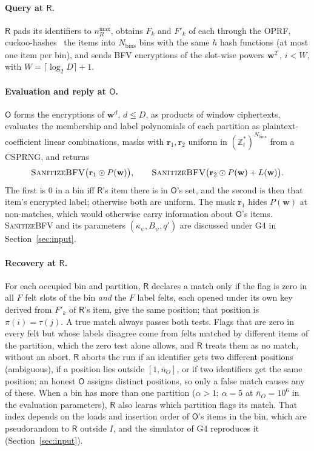 \documentclass[11pt]{article}
\theoremstyle{definition}
\theoremstyle{plain}
\newcommand{\Z}{\mathbb{Z}}
\newcommand{\Party}[1]{\textsf{#1}}
\newcommand{\Rp}{\Party{R}}
\newcommand{\Op}{\Party{O}}
\begin{document}
\paragraph{Query at $\Rp$.} $\Rp$ pads its identifiers to $n_R^{\max}$, obtains $F_k$ and $F'_k$ of each through the OPRF, cuckoo-hashes~\cite{pagh2004cuckoo} the items into $N_{\mathrm{bins}}$ bins with the same $h$ hash functions (at most one item per bin), and sends BFV encryptions of the slot-wise powers $\mathbf{w}^{2^{i}}$, $i < W$, with $W = \lceil \log_{2} D \rceil + 1$.

\paragraph{Evaluation and reply at $\Op$.} $\Op$ forms the encryptions of $\mathbf{w}^{d}$, $d \le D$, as products of window ciphertexts, evaluates the membership and label polynomials of each partition as plaintext-coefficient linear combinations, masks with $\mathbf{r}_{1}, \mathbf{r}_{2}$ uniform in $(\Z_{t}^{\ast})^{N_{\mathrm{bins}}}$ from a CSPRNG, and returns
\[
  \textsc{SanitizeBFV}\bigl(\mathbf{r}_{1} \odot P(\mathbf{w})\bigr), \qquad
  \textsc{SanitizeBFV}\bigl(\mathbf{r}_{2} \odot P(\mathbf{w}) + L(\mathbf{w})\bigr).
\]
The first is $0$ in a bin iff $\Rp$'s item there is in $\Op$'s set, and the second is then that item's encrypted label; otherwise both are uniform. The mask $\mathbf r_1$ hides $P(\mathbf w)$ at non-matches, which would otherwise carry information about $\Op$'s items. \textsc{SanitizeBFV} and its parameters $(\kappa_\psi, B_\psi, q')$ are discussed under G4 in Section~\ref{sec:input}.

\paragraph{Recovery at $\Rp$.} For each occupied bin and partition, $\Rp$ declares a match only if the flag is zero in all $F$ felt slots of the bin \emph{and} the $F$ label felts, each opened under its own key derived from $F'_k$ of $\Rp$'s item, give the same position; that position is $\pi(i) = \tau(j)$. A true match always passes both tests. Flags that are zero in every felt but whose labels disagree come from felts matched by different items of the partition, which the zero test alone allows, and $\Rp$ treats them as no match, without an abort. $\Rp$ aborts the run if an identifier gets two different positions (ambiguous), if a position lies outside $[1, \bar n_O]$, or if two identifiers get the same position; an honest $\Op$ assigns distinct positions, so only a false match causes any of these. When a bin has more than one partition ($\alpha > 1$; $\alpha = 5$ at $\bar n_O = 10^6$ in the evaluation parameters), $\Rp$ also learns which partition flags its match. That index depends on the loads and insertion order of $\Op$'s items in the bin, which are pseudorandom to $\Rp$ outside $I$, and the simulator of G4 reproduces it (Section~\ref{sec:input}).
\end{document}
